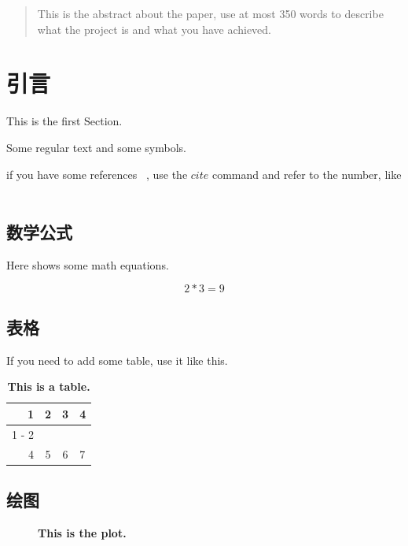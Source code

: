 \documentclass[12pt]{article}
\begin{document}
\begin{abstract}

This is the abstract about the paper, use at most 350 words to describe what the project is and what you have achieved.

\end{abstract}


\section{引言}

This is the first Section.

Some regular text and some symbols.

if you have some references ~\cite{ref1}, use the $cite$ command and refer to the number, like ~\cite{ref2}
 
\subsection{数学公式}
Here shows some math equations.

\begin{equation}
2*3 = 9
\end{equation}

\subsection{表格}

If you need to add some table, use it like this.

\begin{table}[!ht]
\centering
\caption{\bf{This is a table.}}
\begin{tabular}{rc|cl}
\hline
1&2&3&4\\
\cline{1
-
2}
&&&\\
4&5&6&7\\
\end{tabular}
\end{table}

\subsection{绘图}
\begin{figure}[ht!]
\centering
{}
\caption{\bf{This is the plot.}}
\end{figure}
\end{document}
